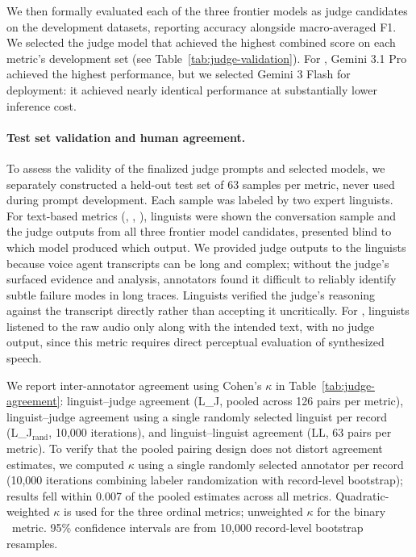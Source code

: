 We then formally evaluated each of the three frontier models as judge candidates on the
development datasets, reporting accuracy alongside macro-averaged F1.
We
selected the judge model that achieved the highest combined score on each
metric's development set (see Table~\ref{tab:judge-validation}).
For \metricfidelity, Gemini 3.1 Pro achieved the highest
performance, but we selected Gemini 3 Flash for deployment: it achieved
nearly identical performance at substantially lower inference cost.



\paragraph{Test set validation and human agreement.}
To assess the validity of the finalized judge prompts and selected
models, we separately constructed a held-out test set of 63 samples per
metric, never used during prompt development. Each sample was labeled by
two expert linguists. For text-based metrics (\metricfaithfulness, \metricconversationprogression, \metricconcise), linguists were shown the conversation sample
and the judge outputs from all three frontier model candidates, presented
blind to which model produced which output. We provided judge outputs to
the linguists because voice agent transcripts can be long and complex;
without the judge's surfaced evidence and analysis, annotators found it
difficult to reliably identify subtle failure modes in long traces.
Linguists verified the judge's reasoning against the transcript directly
rather than accepting it uncritically. For \metricfidelity,
linguists listened to the raw audio only along with the intended text, with no judge output, since
this metric requires direct perceptual evaluation of synthesized speech.

We report inter-annotator agreement using Cohen's $\kappa$ in
Table~\ref{tab:judge-agreement}: linguist--judge agreement (L\_J,
pooled across 126 pairs per metric), linguist--judge agreement using a
single randomly selected linguist per record (L\_J$_\text{rand}$, 10{,}000
iterations), and linguist--linguist agreement (LL, 63 pairs per metric).
To verify that the pooled pairing design does not distort agreement
estimates, we computed $\kappa$ using a single randomly selected annotator
per record (10{,}000 iterations combining labeler randomization with
record-level bootstrap); results fell within 0.007 of the pooled
estimates across all metrics. Quadratic-weighted $\kappa$ is used for the
three ordinal metrics; unweighted $\kappa$ for the binary \metricfidelity~metric. 95\% confidence intervals are from 10{,}000 record-level
bootstrap resamples.

